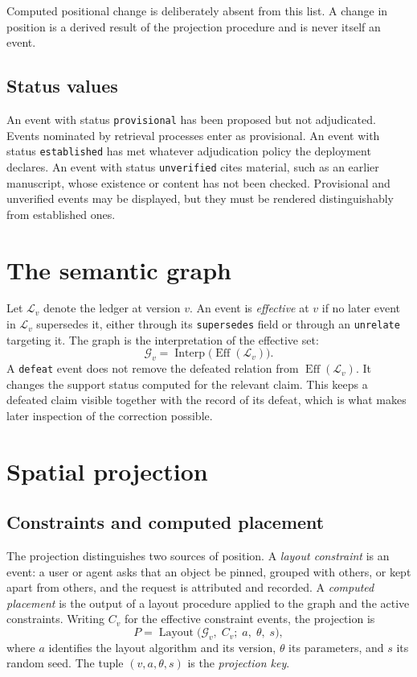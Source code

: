 \documentclass[11pt]{article}
\theoremstyle{definition}
\newcommand{\Ledger}{\mathcal{L}}
\newcommand{\Graph}{\mathcal{G}}
\newcommand{\Eff}{\operatorname{Eff}}
\newcommand{\Interp}{\operatorname{Interp}}
\newcommand{\Layout}{\operatorname{Layout}}
\newcommand{\ev}[1]{\texttt{#1}}
\begin{document}
Computed positional change is deliberately absent from this list. A change in position is a derived result of the projection procedure and is never itself an event.

\subsection{Status values}

An event with status \ev{provisional} has been proposed but not adjudicated. Events nominated by retrieval processes enter as provisional. An event with status \ev{established} has met whatever adjudication policy the deployment declares. An event with status \ev{unverified} cites material, such as an earlier manuscript, whose existence or content has not been checked. Provisional and unverified events may be displayed, but they must be rendered distinguishably from established ones.

\section{The semantic graph}

Let $\Ledger_v$ denote the ledger at version $v$. An event is \emph{effective} at $v$ if no later event in $\Ledger_v$ supersedes it, either through its \ev{supersedes} field or through an \ev{unrelate} targeting it. The graph is the interpretation of the effective set:
\[
\Graph_v = \Interp\bigl(\Eff(\Ledger_v)\bigr).
\]
A \ev{defeat} event does not remove the defeated relation from $\Eff(\Ledger_v)$. It changes the support status computed for the relevant claim. This keeps a defeated claim visible together with the record of its defeat, which is what makes later inspection of the correction possible.

\section{Spatial projection}
\label{sec:projection}

\subsection{Constraints and computed placement}

The projection distinguishes two sources of position. A \emph{layout constraint} is an event: a user or agent asks that an object be pinned, grouped with others, or kept apart from others, and the request is attributed and recorded. A \emph{computed placement} is the output of a layout procedure applied to the graph and the active constraints. Writing $C_v$ for the effective constraint events, the projection is
\[
P = \Layout\bigl(\Graph_v,\; C_v;\; a,\; \theta,\; s\bigr),
\]
where $a$ identifies the layout algorithm and its version, $\theta$ its parameters, and $s$ its random seed. The tuple $(v, a, \theta, s)$ is the \emph{projection key}.
\end{document}
